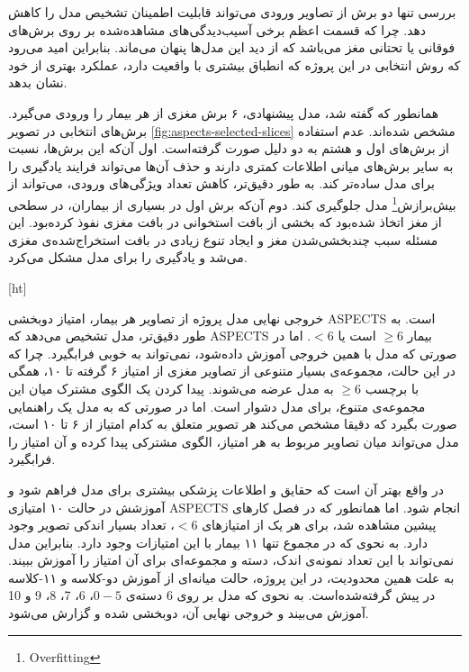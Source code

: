 بررسی تنها دو برش از تصاویر ورودی می‌تواند قابلیت اطمینان تشخیص مدل را کاهش دهد.
چرا که قسمت اعظم برخی آسیب‌دیدگی‌های مشاهده‌شده
بر روی برش‌های فوقانی یا تحتانی مغز می‌باشد که از دید این مدل‌ها پنهان می‌ماند.
بنابراین امید می‌رود که روش انتخابی در این پروژه که انطباق بیشتری با واقعیت دارد، عملکرد بهتری از خود نشان بدهد.

همانطور که گفته شد، مدل پیشنهادی، ۶ برش مغزی از هر بیمار را ورودی می‌گیرد.
 برش‌های انتخابی در تصویر \ref{fig:aspects-selected-slices} مشخص شده‌اند.
 عدم استفاده از برش‌های اول و هشتم 
به دو دلیل صورت گرفته‌است.
اول آن‌که این برش‌ها، نسبت به سایر برش‌های میانی اطلاعات کمتری دارند و حذف آن‌ها می‌تواند فرایند یادگیری را برای مدل ساده‌تر کند.
به طور دقیق‌تر، کاهش تعداد ویژگی‌های ورودی، می‌تواند از 
بیش‌برازش\footnote{Overfitting}
مدل جلوگیری کند.
دوم آن‌که برش اول در بسیاری از بیماران، در سطحی از مغز اتخاذ شده‌بود که 
بخشی از بافت استخوانی در بافت مغزی نفوذ کرده‌بود.
این مسئله سبب چند‌بخشی‌شدن مغز و ایجاد تنوع زیادی در بافت استخراج‌شده‌ی مغزی می‌شد و یادگیری را برای مدل مشکل می‌کرد.

[ht]


خروجی نهایی مدل پروژه از تصاویر هر بیمار، امتیاز دوبخشی ASPECTS است.
به طور دقیق‌تر، مدل تشخیص می‌دهد که ASPECTS بیمار $\geq 6$ است یا $<6$.
اما در صورتی که مدل با همین خروجی آموزش داده‌شود،
نمی‌تواند به خوبی فرابگیرد.
چرا که در این حالت،
مجموعه‌ی بسیار متنوعی از تصاویر مغزی از
امتیاز ۶ گرفته تا ۱۰، همگی با برچسب
$\geq6$ به مدل عرضه می‌شوند.
پیدا کردن یک الگوی مشترک میان این مجموعه‌ی متنوع، برای مدل دشوار است.
اما در صورتی که به مدل یک راهنمایی صورت بگیرد که دقیقا مشخص می‌کند هر تصویر متعلق به کدام امتیاز از ۶ تا ۱۰ است، مدل می‌تواند میان تصاویر مربوط به هر امتیاز، الگوی مشترکی پیدا کرده و آن امتیاز را فرابگیرد.

در واقع بهتر آن است که حقایق و اطلاعات پزشکی بیشتری برای مدل فراهم شود و آموزشش در حالت ۱۰ امتیازی ASPECTS انجام شود.
اما همانطور که در فصل کار‌های پیشین مشاهده شد، برای هر یک از امتیاز‌های $<6$، تعداد بسیار اندکی تصویر وجود دارد.
به نحوی که در مجموع تنها ۱۱ بیمار با این امتیازات وجود دارد.
بنابراین مدل نمی‌تواند با این تعداد نمونه‌ی اندک، دسته و مجموعه‌ای برای آن امتیاز را آموزش ببیند.
به علت همین محدودیت، در این پروژه، حالت میانه‌ای از آموزش دو-کلاسه و ۱۱-کلاسه در پیش گرفته‌شده‌است.
به نحوی که مدل بر روی 6 دسته‌ی $0-5$، 6، 7، 8، 9 و 10 آموزش می‌بیند و خروجی نهایی آن،‌ دوبخشی شده و گزارش می‌شود.


